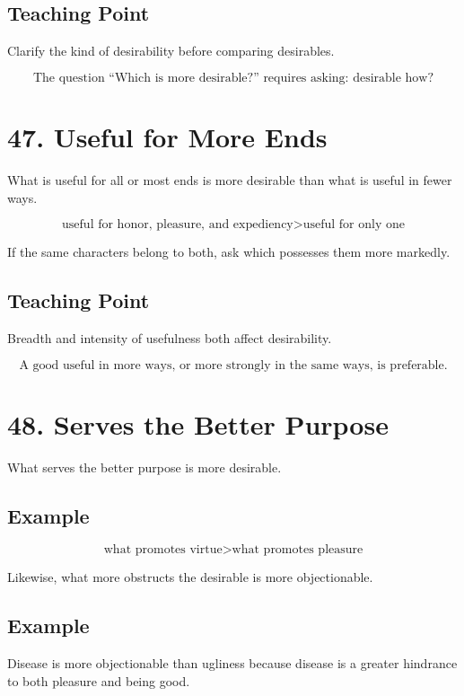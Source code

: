 \documentclass[12pt]{article}
\begin{document}
\subsection*{Teaching Point}

Clarify the kind of desirability before comparing desirables.

\[
\boxed{
\text{The question ``Which is more desirable?'' requires asking: desirable how?}
}
\]

\section*{47. Useful for More Ends}

What is useful for all or most ends is more desirable than what is useful in
fewer ways.

\[
\text{useful for honor, pleasure, and expediency}
>
\text{useful for only one}
\]

If the same characters belong to both, ask which possesses them more markedly.

\subsection*{Teaching Point}

Breadth and intensity of usefulness both affect desirability.

\[
\boxed{
\text{A good useful in more ways, or more strongly in the same ways, is preferable.}
}
\]

\section*{48. Serves the Better Purpose}

What serves the better purpose is more desirable.

\subsection*{Example}

\[
\text{what promotes virtue} > \text{what promotes pleasure}
\]

Likewise, what more obstructs the desirable is more objectionable.

\subsection*{Example}

Disease is more objectionable than ugliness because disease is a greater
hindrance to both pleasure and being good.
\end{document}
